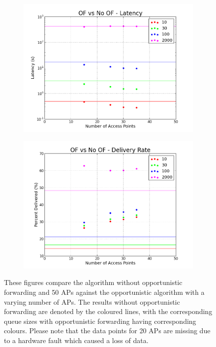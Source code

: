         \begin{figure}
            \centering
            \begin{subfigure}{0.5\textwidth}
                \centering
                \includegraphics[width=\linewidth]{./images/OF_vs_No_OF_Latency.png}
                \caption{}
                \label{fig:of_num_aps_latency}
            \end{subfigure}%
            \begin{subfigure}{0.5\textwidth}
                \includegraphics[width=\linewidth]{./images/OF_vs_No_OF_Percentage.png}
                \caption{}
                \label{fig:of_num_aps_percentage}
            \end{subfigure}
            \caption{These figures compare the algorithm without opportunistic forwarding and 50 APs against the opportunistic algorithm with a varying number of APs. The results without opportunistic forwarding are denoted by the coloured lines, with the corresponding queue sizes with opportunistic forwarding having corresponding colours. Please note that the data points for 20 APs are missing due to a hardware fault which caused a loss of data.}
            \label{fig:of_num_aps}
        \end{figure}


